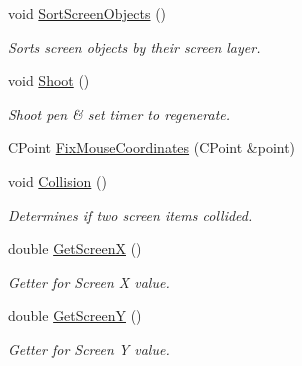 \begin{DoxyCompactItemize}
\item 
\mbox{\label{class_c_screen_a61897cc3fce79e9c3965e2c27d86e415}} 
void \mbox{\hyperlink{class_c_screen_a61897cc3fce79e9c3965e2c27d86e415}{Sort\+Screen\+Objects}} ()
\begin{DoxyCompactList}\small\item\em Sorts screen objects by their screen layer. \end{DoxyCompactList}\item 
\mbox{\label{class_c_screen_a2e9a5959e766bdae40facec7390add14}} 
void \mbox{\hyperlink{class_c_screen_a2e9a5959e766bdae40facec7390add14}{Shoot}} ()
\begin{DoxyCompactList}\small\item\em Shoot pen \& set timer to regenerate. \end{DoxyCompactList}\item 
C\+Point \mbox{\hyperlink{class_c_screen_a1ae61bc753806e18b44b3e1360611409}{Fix\+Mouse\+Coordinates}} (C\+Point \&point)
\item 
void \mbox{\hyperlink{class_c_screen_accc394df9102d2a11b87420deea1d83f}{Collision}} ()
\begin{DoxyCompactList}\small\item\em Determines if two screen items collided. \end{DoxyCompactList}\item 
\mbox{\label{class_c_screen_a314001f8132de9da1840ac6e85e7f5a4}} 
double \mbox{\hyperlink{class_c_screen_a314001f8132de9da1840ac6e85e7f5a4}{Get\+ScreenX}} ()
\begin{DoxyCompactList}\small\item\em Getter for Screen X value. \end{DoxyCompactList}\item 
\mbox{\label{class_c_screen_a1c5a11c6958fd78a46a68f33eaa4b376}} 
double \mbox{\hyperlink{class_c_screen_a1c5a11c6958fd78a46a68f33eaa4b376}{Get\+ScreenY}} ()
\begin{DoxyCompactList}\small\item\em Getter for Screen Y value. \end{DoxyCompactList}\item 
\mbox{\label{class_c_screen_a483c77121786543b4047874217d33b73}} 

\end{DoxyCompactItemize}
